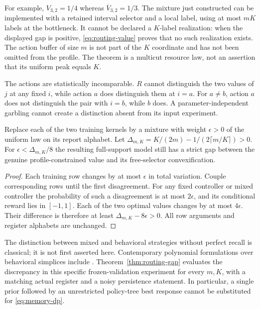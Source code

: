 For example, $V_{3,2}=1/4$ whereas $\overline V_{3,2}=1/3$.
The mixture just constructed can be implemented with a retained interval
selector and a local label, using at most $mK$ labels at the bottleneck.
It cannot be declared a $K$-label realization: when the displayed gap is
positive, \eqref{eq:routing-value} proves that no such realization exists.
The action buffer of size $m$ is not part of the $K$ coordinate and has
not been omitted from the profile. The theorem is a multicut resource
law, not an assertion that its uniform peak equals $K$.

The actions are statistically incomparable. $R$ cannot distinguish the
two values of $j$ at any fixed $i$, while action $a$ does distinguish
them at $i=a$. For $a\ne b$, action $a$ does not distinguish the pair
with $i=b$, while $b$ does. A parameter-independent garbling cannot
create a distinction absent from its input experiment.

\begin{corollary}
\label{cor:routing-noise}
Replace each of the two training kernels by a mixture with weight
$\epsilon>0$ of the uniform law on its report alphabet. Let
$\Delta_{m,K}=K/(2m)-1/(2\lceil m/K\rceil)>0$.
For $\epsilon<\Delta_{m,K}/8$ the resulting full-support model still
has a strict gap between the genuine profile-constrained value and its
free-selector convexification.
\end{corollary}
\begin{proof}
Each training row changes by at most $\epsilon$ in total variation.
Couple corresponding rows until the first disagreement. For any fixed
controller or mixed controller the probability of such a disagreement
is at most $2\epsilon$, and its conditional reward lies in $[-1,1]$.
Each of the two optimal values changes by at most $4\epsilon$.
Their difference is therefore at least $\Delta_{m,K}-8\epsilon>0$.
All row arguments and register alphabets are unchanged.
\end{proof}

The distinction between mixed and behavioral strategies without perfect
recall is classical; it is not first asserted here. Contemporary
polynomial formulations over behavioral simplices include
\cite{ZSV}. Theorem~\ref{thm:routing-gap} evaluates the discrepancy in
this specific frozen-validation experiment for every $m,K$, with a
matching actual register and a noisy persistence statement. In
particular, a single prior followed by an unrestricted policy-tree
best response cannot be substituted for \eqref{eq:memory-dp}.

